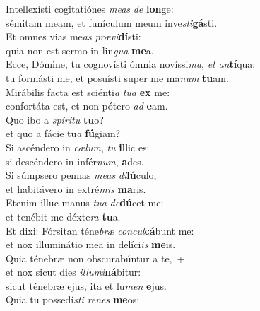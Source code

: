 \evenverse Intellexísti cogitatiónes \textit{me}\textit{as} \textit{de} \textbf{lon}ge:~\*\\
\evenverse sémitam meam, et funículum meum inve\textit{sti}\textbf{gá}sti.\\
\oddverse Et omnes vias me\textit{as} \textit{præ}\textit{vi}\textbf{dí}sti:~\*\\
\oddverse quia non est sermo in lin\textit{gua} \textbf{me}a.\\
\evenverse Ecce, Dómine, tu cognovísti ómnia novíssi\textit{ma}, \textit{et} \textit{an}\textbf{tí}qua:~\*\\
\evenverse tu formásti me, et posuísti super me ma\textit{num} \textbf{tu}am.\\
\oddverse Mirábilis facta est sciénti\textit{a} \textit{tu}\textit{a} \textbf{ex} me:~\*\\
\oddverse confortáta est, et non pótero \textit{ad} \textbf{e}am.\\
\evenverse Quo ibo a \textit{spí}\textit{ri}\textit{tu} \textbf{tu}o?~\*\\
\evenverse et quo a fácie tu\textit{a} \textbf{fú}giam?\\
\oddverse Si ascéndero in \textit{cæ}\textit{lum}, \textit{tu} \textbf{il}lic es:~\*\\
\oddverse si descéndero in infér\textit{num}, \textbf{a}des.\\
\evenverse Si súmpsero pennas \textit{me}\textit{as} \textit{di}\textbf{lú}culo,~\*\\
\evenverse et habitávero in extré\textit{mis} \textbf{ma}ris.\\
\oddverse Etenim illuc manus \textit{tu}\textit{a} \textit{de}\textbf{dú}cet me:~\*\\
\oddverse et tenébit me déxte\textit{ra} \textbf{tu}a.\\
\evenverse Et dixi: Fórsitan téne\textit{bræ} \textit{con}\textit{cul}\textbf{cá}bunt me:~\*\\
\evenverse et nox illuminátio mea in delíci\textit{is} \textbf{me}is.\\
\oddverse Quia ténebræ non obscurabúntur a te,~+\\
\oddverse  et nox sicut dies \textit{il}\textit{lu}\textit{mi}\textbf{ná}bitur:~\*\\
\oddverse sicut ténebræ ejus, ita et lu\textit{men} \textbf{e}jus.\\
\evenverse Quia tu possedí\textit{sti} \textit{re}\textit{nes} \textbf{me}os:~\*\\
